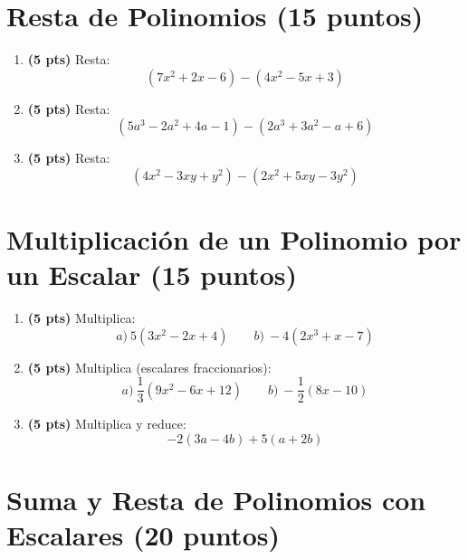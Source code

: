 \documentclass[12pt, letterpaper]{article}
\begin{document}
\newpage

\section{Resta de Polinomios (15 puntos)}

\begin{enumerate}[leftmargin=*]
  \item \textbf{(5 pts)} Resta:
        \[
          (7x^2 + 2x - 6) - (4x^2 - 5x + 3)
        \]

  \item \textbf{(5 pts)} Resta:
        \[
          (5a^3 - 2a^2 + 4a - 1) - (2a^3 + 3a^2 - a + 6)
        \]

  \item \textbf{(5 pts)} Resta:
        \[
          (4x^2 - 3xy + y^2) - (2x^2 + 5xy - 3y^2)
        \]
\end{enumerate}

\newpage

\section{Multiplicación de un Polinomio por un Escalar (15 puntos)}

\begin{enumerate}[leftmargin=*]
  \item \textbf{(5 pts)} Multiplica:
        \[
          a)\ 5(3x^2 - 2x + 4) \qquad b)\ -4(2x^3 + x - 7)
        \]

  \item \textbf{(5 pts)} Multiplica (escalares fraccionarios):
        \[
          a)\ \frac{1}{3}(9x^2 - 6x + 12) \qquad b)\ -\frac{1}{2}(8x - 10)
        \]

  \item \textbf{(5 pts)} Multiplica y reduce:
        \[
          -2(3a - 4b) + 5(a + 2b)
        \]
\end{enumerate}

\newpage

\section{Suma y Resta de Polinomios con Escalares (20 puntos)}
\end{document}
